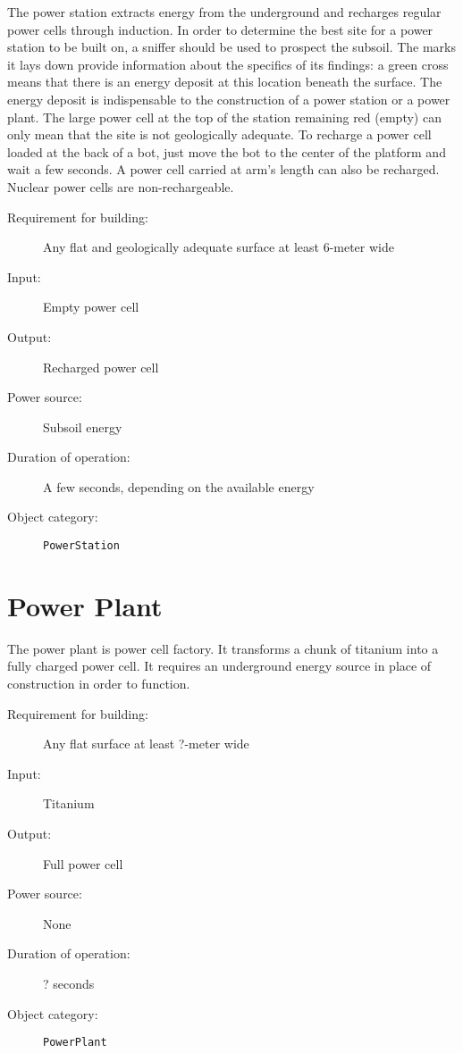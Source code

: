 The power station extracts energy from the underground and recharges regular power cells through induction. In order to determine the best site for a power station to be built on, a sniffer should be used to prospect the subsoil. The marks it lays down provide information about the specifics of its findings: a green cross means that there is an energy deposit at this location beneath the surface. The energy deposit is indispensable to the construction of a power station or a power plant. The large power cell at the top of the station remaining red (empty) can only mean that the site is not geologically adequate. To recharge a power cell loaded at the back of a bot, just move the bot to the center of the platform and wait a few seconds. A power cell carried at arm's length can also be recharged. Nuclear power cells are non-rechargeable.

\begin{description}
    \item[Requirement for building:] Any flat and geologically adequate surface at least 6-meter wide
    \item[Input:] Empty power cell
    \item[Output:] Recharged power cell
    \item[Power source:] Subsoil energy
    \item[Duration of operation:] A few seconds, depending on the available energy
    \item[Object category:] \texttt{PowerStation}
\end{description}


\section{Power Plant}


The power plant is power cell factory. It transforms a chunk of titanium into a fully charged power cell. It requires an underground energy source in place of construction in order to function.

\begin{description}
    \item[Requirement for building:] Any flat surface at least ?-meter wide
    \item[Input:] Titanium
    \item[Output:] Full power cell
    \item[Power source:] None
    \item[Duration of operation:] ? seconds
    \item[Object category:] \texttt{PowerPlant}
\end{description}


